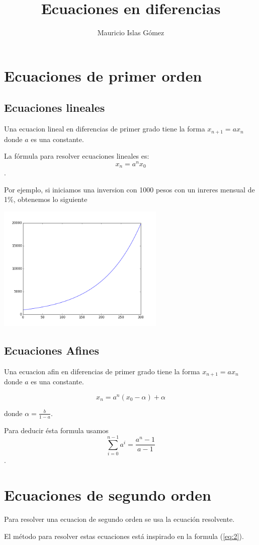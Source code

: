 \documentclass{article}
\title{Ecuaciones en diferencias}
\author{Mauricio Islas Gómez}
\begin{document}
\maketitle

\section{Ecuaciones de primer orden}

\subsection{Ecuaciones lineales}

Una ecuacion lineal en diferencias de primer grado tiene la forma $x_{n+1}=ax_{n}$ donde $a$ es una constante.

La fórmula para resolver ecuaciones lineales es:
\begin{equation}
  \label{eq:2}
  x_n=a^nx_0
\end{equation}.

Por ejemplo, si iniciamos una inversion con 1000 pesos con un inreres mensual de 1\%, obtenemos lo siguiente

\begin{center}
  \includegraphics[width=8cm]{inversion.png}
\end{center}
\subsection{Ecuaciones Afines}

Una ecuacion afin en diferencias de primer grado tiene la forma $x_{n+1}=ax_{n}$ donde $a$ es una constante.

\begin{equation}
  \label{eq:1}
  x_n=a^n(x_0-\alpha)+\alpha
\end{equation}

donde $\alpha=\frac{b}{1-a}$.

Para deducir ésta formula usamos $$\sum_{i=0}^{n-1}a^i=\frac{a^n-1}{a-1}$$.

\section{Ecuaciones de segundo orden}

Para resolver una ecuacion de segundo orden se usa la ecuación resolvente.

El método para resolver estas ecuaciones está inspirado en la formula (\ref{eq:2}).
\end{document}
